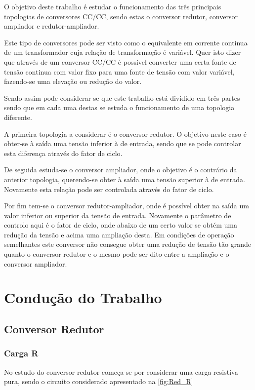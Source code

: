 \documentclass[a4paper,11pt]{article}
\numberwithin{equation}{section}
\begin{document}
O objetivo deste trabalho é estudar o funcionamento das três principais topologias de conversores CC/CC, sendo estas o conversor redutor, conversor ampliador e redutor-ampliador.

Este tipo de conversores pode ser visto como o equivalente em corrente continua de um transformador cuja relação de transformação é variável. Quer isto dizer que através de um conversor CC/CC é possível converter uma certa fonte de tensão continua com valor fixo para uma fonte de tensão com valor variável, fazendo-se uma elevação ou redução do valor. \cite{Rashid}

Sendo assim pode considerar-se que este trabalho está dividido em três partes sendo que em cada uma destas se estuda o funcionamento de uma topologia diferente.

A primeira topologia a considerar é o conversor redutor. O objetivo neste caso é obter-se à saída uma tensão inferior à de entrada, sendo que se pode controlar esta diferença através do fator de ciclo.

De seguida estuda-se o conversor ampliador, onde o objetivo é o contrário da anterior topologia, querendo-se obter à saída uma tensão superior à de entrada. Novamente esta relação pode ser controlada através do fator de ciclo.

Por fim tem-se o conversor redutor-ampliador, onde é possível obter na saída um valor inferior ou superior da tensão de entrada. Novamente o parâmetro de controlo aqui é o fator de ciclo, onde abaixo de um certo valor se obtém uma redução da tensão e acima uma ampliação desta. Em condições de operação semelhantes este conversor não consegue obter uma redução de tensão tão grande quanto o conversor redutor e o mesmo pode ser dito entre a ampliação e o conversor ampliador.


\section{Condução do Trabalho}

\subsection{Conversor Redutor}

\subsubsection{Carga R}

No estudo do conversor redutor começa-se por considerar uma carga resistiva pura, sendo o circuito considerado apresentado na \autoref{fig:Red_R}
\end{document}
